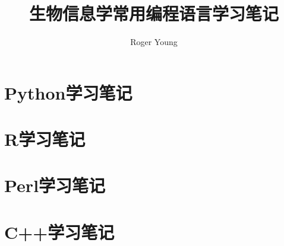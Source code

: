 \documentclass{ctexbook}
\newcommand{\documentTitle}
    {\texorpdfstring{生物信息学常用编程语言学习笔记}{生物信息学常用编程语言学习笔记}}
\newcommand{\documentAuthor}{Roger Young}
\begin{document}
\title{\documentTitle}
\author{\documentAuthor}

\maketitle
\tableofcontents



\part{Python学习笔记}



\part{R学习笔记}



\part{Perl学习笔记}

\part{C++学习笔记}


\printindex
\printglossaries
\end{document}
